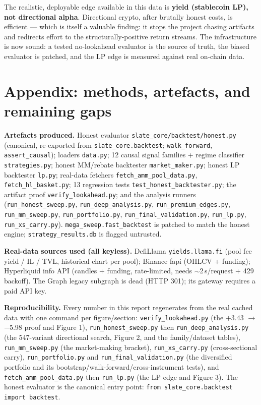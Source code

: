 \documentclass[11pt,a4paper]{article}
\begin{document}
The realistic, deployable edge available in this data is \textbf{yield (stablecoin LP), not directional alpha}. Directional crypto, after brutally honest costs, is efficient --- which is itself a valuable finding: it stops the project chasing artifacts and redirects effort to the structurally-positive return streams. The infrastructure is now sound: a tested no-lookahead evaluator is the source of truth, the biased evaluator is patched, and the LP edge is measured against real on-chain data.

\section*{Appendix: methods, artefacts, and remaining gaps}

\textbf{Artefacts produced.} Honest evaluator \texttt{slate\_core/backtest/honest.py} (canonical, re-exported from \texttt{slate\_core.backtest}; \texttt{walk\_forward}, \texttt{assert\_causal}); loaders \texttt{data.py}; 12 causal signal families + regime classifier \texttt{strategies.py}; honest MM/rebate backtester \texttt{market\_maker.py}; honest LP backtester \texttt{lp.py}; real-data fetchers \texttt{fetch\_amm\_pool\_data.py}, \texttt{fetch\_hl\_basket.py}; 13 regression tests \texttt{test\_honest\_backtester.py}; the artifact proof \texttt{verify\_lookahead.py}; and the analysis runners (\texttt{run\_honest\_sweep.py}, \texttt{run\_deep\_analysis.py}, \texttt{run\_premium\_edges.py}, \texttt{run\_mm\_sweep.py}, \texttt{run\_portfolio.py}, \texttt{run\_final\_validation.py}, \texttt{run\_lp.py}, \texttt{run\_xs\_carry.py}). \texttt{mega\_sweep.fast\_backtest} is patched to match the honest engine; \texttt{strategy\_results.db} is flagged untrusted.

\textbf{Real-data sources used (all keyless).} DefiLlama \texttt{yields.llama.fi} (pool fee yield / IL / TVL, historical chart per pool); Binance fapi (OHLCV + funding); Hyperliquid info API (candles + funding, rate-limited, needs $\sim$2\,s/request + 429 backoff). The Graph legacy subgraph is dead (HTTP 301); its gateway requires a paid API key.

\textbf{Reproducibility.} Every number in this report regenerates from the real cached data with one command per figure/section: \texttt{verify\_lookahead.py} (the $+$3.43 $\to$ $-$5.98 proof and Figure 1), \texttt{run\_honest\_sweep.py} then \texttt{run\_deep\_analysis.py} (the 547-variant directional search, Figure 2, and the family/dataset tables), \texttt{run\_mm\_sweep.py} (the market-making bracket), \texttt{run\_xs\_carry.py} (cross-sectional carry), \texttt{run\_portfolio.py} and \texttt{run\_final\_validation.py} (the diversified portfolio and its bootstrap/walk-forward/cross-instrument tests), and \texttt{fetch\_amm\_pool\_data.py} then \texttt{run\_lp.py} (the LP edge and Figure 3). The honest evaluator is the canonical entry point: \texttt{from slate\_core.backtest import backtest}.
\end{document}
